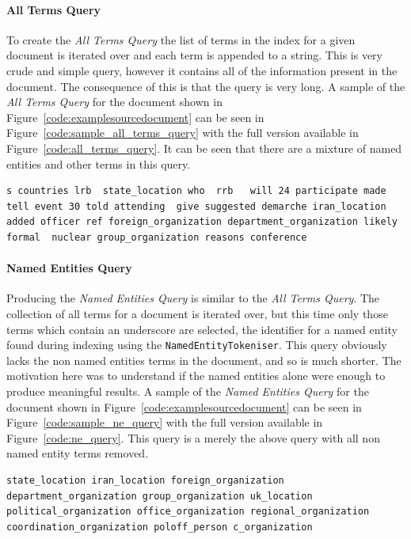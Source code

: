 \documentclass{l4proj}
\newcommand{\code}[1]{\texttt{#1}}
\newenvironment{codelisting}{\captionsetup{type=listing}}{}
\begin{document}
\paragraph{All Terms Query}
To create the \textit{All Terms Query} the list of terms in the index for a given document is iterated over and each term is appended to a string. This is very crude and simple query, however it contains all of the information present in the document. The consequence of this is that the query is very long. A sample of the \textit{All Terms Query} for the document shown in Figure~\ref{code:examplesourcedocument} can be seen in Figure~\ref{code:sample_all_terms_query} with the full version available in Figure~\ref{code:all_terms_query}. It can be seen that there are a mixture of named entities and other terms in this query.
\begin{codelisting}
\begin{verbatim}
s countries lrb  state_location who  rrb   will 24 participate made tell event 30 told attending  give suggested demarche iran_location added officer ref foreign_organization department_organization likely formal  nuclear group_organization reasons conference
\end{verbatim}
\label{code:sample_all_terms_query}
\end{codelisting}
\paragraph{Named Entities Query}
Producing the \textit{Named Entities Query} is similar to the \textit{All Terms Query}. The collection of all terms for a document is iterated over, but this time only those terms which contain an underscore are selected, the identifier for a named entity found during indexing using the \code{NamedEntityTokeniser}. This query obviously lacks the non named entities terms in the document, and so is much shorter. The motivation here was to understand if the named entities alone were enough to produce meaningful results. A sample of the \textit{Named Entities Query} for the document shown in Figure~\ref{code:examplesourcedocument} can be seen in Figure~\ref{code:sample_ne_query} with the full version available in Figure~\ref{code:ne_query}. This query is a merely the above query with all non named entity terms removed.
\begin{codelisting}
\begin{verbatim}
state_location iran_location foreign_organization department_organization group_organization uk_location political_organization office_organization regional_organization coordination_organization poloff_person c_organization
\end{verbatim}
\label{code:sample_ne_query}
\end{codelisting}
\end{document}

